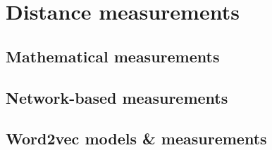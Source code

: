 \documentclass{thesisclass}
\begin{document}
\section{Distance measurements}

\subsection{Mathematical measurements}

\subsection{Network-based measurements}

\subsection{Word2vec models \& measurements}
\end{document}
